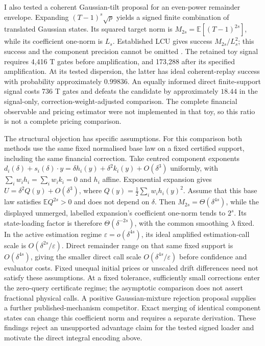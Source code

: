 I also tested a coherent Gaussian-tilt proposal for an even-power remainder
envelope. Expanding $(T-1)^s\sqrt{p}$ yields a signed finite combination
of translated Gaussian states. Its squared target norm is
$M_{2s}=\mathbb E[(T-1)^{2s}]$, while its coefficient one-norm is $L_s$.
Established LCU gives success $M_{2s}/L_s^2$; this success and the
component precision cannot be omitted \citep{rosenkranz2025,ozols2013}.
The retained toy signal requires 4,416 T gates before amplification,
and 173,288 after its specified amplification. At its tested dispersion,
the latter has ideal coherent-replay success with probability approximately $0.99836$.
An equally informed direct finite-support signal costs 736 T gates and
defeats the candidate by approximately $18.44$ in the signal-only,
correction-weight-adjusted comparison. The complete financial observable
and pricing estimator were not implemented in that toy, so this ratio is
not a complete pricing comparison.

The structural objection has specific assumptions. For this comparison both methods use the same fixed normalised base law
on a fixed certified support, including the same financial correction. Take
centred component exponents $d_i(\delta)+s_i(\delta)\cdot y
=\delta h_i(y)+\delta^2 k_i(y)+O(\delta^3)$ uniformly, with
$\sum_iw_ih_i=\sum_iw_ik_i=0$ and $h_i$ affine. Exponential expansion gives
$U=\delta^2 Q(y)+O(\delta^3)$, where
$Q(y)=\tfrac12\sum_iw_ih_i(y)^2$.
Assume that this base law satisfies $\mathbb E Q^{2s}>0$ and does not depend
on $\delta$. Then $M_{2s}=\Theta(\delta^{4s})$, while the displayed unmerged, labelled expansion's
coefficient one-norm tends to $2^s$. Its state-loading factor is therefore
$\Theta(\delta^{-2s})$, with the common smoothing $\lambda$ fixed.
In the active estimation regime $\varepsilon=o(\delta^{4s})$, its ideal
amplified estimation-call scale is $O(\delta^{2s}/\varepsilon)$.
Direct remainder range on that same fixed support is $O(\delta^{4s})$,
giving the smaller direct call scale $O(\delta^{4s}/\varepsilon)$ before
confidence and evaluator costs. Fixed unequal initial prices or unscaled
drift differences need not satisfy these assumptions. At a fixed tolerance,
sufficiently small corrections enter the zero-query certificate regime;
the asymptotic comparison does not assert fractional physical calls. A positive Gaussian-mixture rejection proposal supplies a further
published-mechanism competitor. Exact merging of identical component states can change this coefficient
norm and requires a separate derivation. These findings reject an unsupported
advantage claim for the tested signed loader and motivate the direct integral
encoding above.


